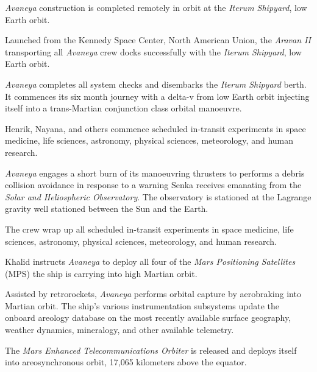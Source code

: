 {\it Avaneya} construction is completed remotely in orbit at the {\it Iterum Shipyard}, low Earth orbit.
\StopTimelineDate

Launched from the Kennedy Space Center, North American Union, the {\it Aravan II} transporting all {\it Avaneya} crew docks successfully with the {\it Iterum Shipyard}, low Earth orbit.
\StopTimelineDate

{\it Avaneya} completes all system checks and disembarks the {\it Iterum Shipyard} berth. It commences its six month journey with a delta-v from low Earth orbit injecting itself into a trans-Martian conjunction class orbital manoeuvre.
\StopTimelineDate

Henrik, Nayana, and others commence scheduled in-transit experiments in space medicine, life sciences, astronomy, physical sciences, meteorology, and human research.
\StopTimelineDate

{\it Avaneya} engages a short burn of its manoeuvring thrusters to performs a debris collision avoidance in response to a warning Senka receives emanating from the {\it Solar and Heliospheric Observatory}. The observatory is stationed at the Lagrange  gravity well stationed between the Sun and the Earth.
\StopTimelineDate

The crew wrap up all scheduled in-transit experiments in space medicine, life sciences, astronomy, physical sciences, meteorology, and human research.
\StopTimelineDate

Khalid instructs {\it Avaneya} to deploy all four of the {\it Mars Positioning Satellites} (MPS) the ship is carrying into high Martian orbit.
\StopTimelineDate

Assisted by retrorockets, {\it Avaneya} performs orbital capture by aerobraking into Martian orbit. The ship's various instrumentation subsystems update the onboard areology database on the most recently available surface geography, weather dynamics, mineralogy, and other available telemetry.

The {\it Mars Enhanced Telecommunications Orbiter} is released and deploys itself into areosynchronous orbit, 17,065 kilometers above the equator.

